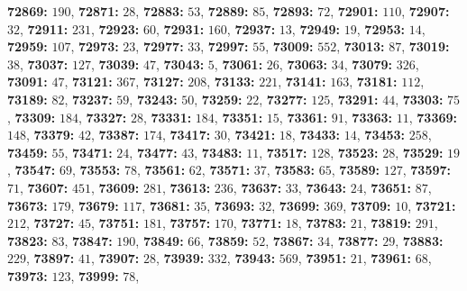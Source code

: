 \textsf{\bfseries 72869:} $190$, \textsf{\bfseries 72871:} $28$, \textsf{\bfseries 72883:} $53$, \textsf{\bfseries 72889:} $85$, \textsf{\bfseries 72893:} $72$, \textsf{\bfseries 72901:} $110$, \textsf{\bfseries 72907:} $32$, \textsf{\bfseries 72911:} $231$, \textsf{\bfseries 72923:} $60$, \textsf{\bfseries 72931:} $160$, \textsf{\bfseries 72937:} $13$, \textsf{\bfseries 72949:} $19$, \textsf{\bfseries 72953:} $14$, \textsf{\bfseries 72959:} $107$, \textsf{\bfseries 72973:} $23$, \textsf{\bfseries 72977:} $33$, \textsf{\bfseries 72997:} $55$, \textsf{\bfseries 73009:} $552$, \textsf{\bfseries 73013:} $87$, \textsf{\bfseries 73019:} $38$, \textsf{\bfseries 73037:} $127$, \textsf{\bfseries 73039:} $47$, \textsf{\bfseries 73043:} $5$, \textsf{\bfseries 73061:} $26$, \textsf{\bfseries 73063:} $34$, \textsf{\bfseries 73079:} $326$, \textsf{\bfseries 73091:} $47$, \textsf{\bfseries 73121:} $367$, \textsf{\bfseries 73127:} $208$, \textsf{\bfseries 73133:} $221$, \textsf{\bfseries 73141:} $163$, \textsf{\bfseries 73181:} $112$, \textsf{\bfseries 73189:} $82$, \textsf{\bfseries 73237:} $59$, \textsf{\bfseries 73243:} $50$, \textsf{\bfseries 73259:} $22$, \textsf{\bfseries 73277:} $125$, \textsf{\bfseries 73291:} $44$, \textsf{\bfseries 73303:} $75$, \textsf{\bfseries 73309:} $184$, \textsf{\bfseries 73327:} $28$, \textsf{\bfseries 73331:} $184$, \textsf{\bfseries 73351:} $15$, \textsf{\bfseries 73361:} $91$, \textsf{\bfseries 73363:} $11$, \textsf{\bfseries 73369:} $148$, \textsf{\bfseries 73379:} $42$, \textsf{\bfseries 73387:} $174$, \textsf{\bfseries 73417:} $30$, \textsf{\bfseries 73421:} $18$, \textsf{\bfseries 73433:} $14$, \textsf{\bfseries 73453:} $258$, \textsf{\bfseries 73459:} $55$, \textsf{\bfseries 73471:} $24$, \textsf{\bfseries 73477:} $43$, \textsf{\bfseries 73483:} $11$, \textsf{\bfseries 73517:} $128$, \textsf{\bfseries 73523:} $28$, \textsf{\bfseries 73529:} $19$, \textsf{\bfseries 73547:} $69$, \textsf{\bfseries 73553:} $78$, \textsf{\bfseries 73561:} $62$, \textsf{\bfseries 73571:} $37$, \textsf{\bfseries 73583:} $65$, \textsf{\bfseries 73589:} $127$, \textsf{\bfseries 73597:} $71$, \textsf{\bfseries 73607:} $451$, \textsf{\bfseries 73609:} $281$, \textsf{\bfseries 73613:} $236$, \textsf{\bfseries 73637:} $33$, \textsf{\bfseries 73643:} $24$, \textsf{\bfseries 73651:} $87$, \textsf{\bfseries 73673:} $179$, \textsf{\bfseries 73679:} $117$, \textsf{\bfseries 73681:} $35$, \textsf{\bfseries 73693:} $32$, \textsf{\bfseries 73699:} $369$, \textsf{\bfseries 73709:} $10$, \textsf{\bfseries 73721:} $212$, \textsf{\bfseries 73727:} $45$, \textsf{\bfseries 73751:} $181$, \textsf{\bfseries 73757:} $170$, \textsf{\bfseries 73771:} $18$, \textsf{\bfseries 73783:} $21$, \textsf{\bfseries 73819:} $291$, \textsf{\bfseries 73823:} $83$, \textsf{\bfseries 73847:} $190$, \textsf{\bfseries 73849:} $66$, \textsf{\bfseries 73859:} $52$, \textsf{\bfseries 73867:} $34$, \textsf{\bfseries 73877:} $29$, \textsf{\bfseries 73883:} $229$, \textsf{\bfseries 73897:} $41$, \textsf{\bfseries 73907:} $28$, \textsf{\bfseries 73939:} $332$, \textsf{\bfseries 73943:} $569$, \textsf{\bfseries 73951:} $21$, \textsf{\bfseries 73961:} $68$, \textsf{\bfseries 73973:} $123$, \textsf{\bfseries 73999:} $78$, 
